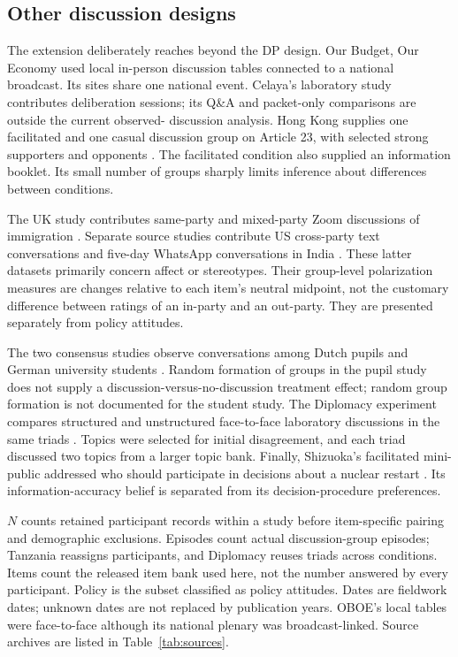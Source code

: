 \documentclass[11pt]{article}
\begin{document}
\subsection{Other discussion designs}
The extension deliberately reaches beyond the DP design. Our Budget, Our Economy
used local in-person discussion tables connected to a national broadcast. Its
sites share one national event. Celaya's laboratory study contributes deliberation
sessions; its Q\&A and packet-only comparisons are outside the current observed-
discussion analysis. Hong Kong supplies one facilitated and one casual discussion
group on Article 23, with selected strong supporters and opponents \citep{hongkong}.
The facilitated condition also supplied an information booklet. Its small number
of groups sharply limits inference about differences between conditions.

The UK study contributes same-party and mixed-party Zoom discussions of immigration
\citep{echo}. Separate source studies contribute US cross-party text conversations
and five-day WhatsApp conversations in India \citep{whatsapp}. These latter datasets
primarily concern affect or stereotypes. Their group-level polarization measures
are changes relative to each item's neutral midpoint, not the customary difference
between ratings of an in-party and an out-party. They are presented separately
from policy attitudes.

The two consensus studies observe conversations among Dutch pupils and German
university students \citep{consensus}. Random formation of groups in the pupil
study does not supply a discussion-versus-no-discussion treatment effect; random
group formation is not documented for the student study. The Diplomacy experiment
compares structured and unstructured face-to-face laboratory discussions in the
same triads \citep{diplomacy}. Topics were selected for initial disagreement, and
each triad discussed two topics from a larger topic bank. Finally, Shizuoka's
facilitated mini-public addressed who should participate in decisions about a
nuclear restart \citep{shizuoka}. Its information-accuracy belief is separated
from its decision-procedure preferences.

\begin{landscape}
\begin{table}[p]
\centering\small
\caption{Studies in the out-of-sample replication and extension}
\label{tab:inventory}

\begin{minipage}{.95\linewidth}\footnotesize
$N$ counts retained participant records within a study before item-specific pairing
and demographic exclusions. Episodes count actual discussion-group episodes;
Tanzania reassigns participants, and Diplomacy reuses triads across conditions.
Items count the released item bank used here, not the number answered by every
participant. Policy is the subset classified as policy attitudes. Dates are
fieldwork dates; unknown dates are not replaced by publication years. OBOE's
local tables were face-to-face although its national plenary was broadcast-linked.
Source archives are listed in Table~\ref{tab:sources}.
\end{minipage}
\end{table}
\end{landscape}
\end{document}

